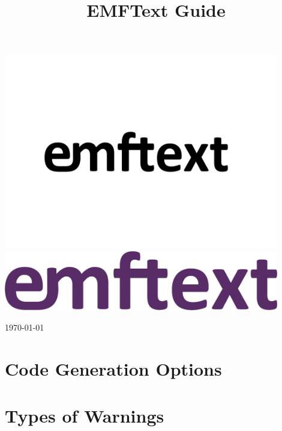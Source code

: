 \documentclass[smallheadings,headsepline,pointlessnumbers,11pt,a4paper]{scrbook}
\title{EMFText Guide}
\newcommand{\changefont}[3]{\fontfamily{#1} \fontseries{#2} \fontshape{#3} \selectfont}
\let\origdoublepage\cleardoublepage
\renewcommand{\cleardoublepage}{%
  \clearpage{\pagestyle{empty}\origdoublepage}}
\begin{document}
\begin{titlepage}

\hbox{}
\vspace{4cm}

\begin{center}

\ifpdf
	\includegraphics[width=0.9\textwidth]{figures/EMFTextLogo.pdf}
\else
	\includegraphics[width=0.9\textwidth]{figures/EMFTextLogo.png}
\fi

\vspace{3cm}
{
\fontsize{40}{40}
\changefont{phv}{m}{n}{USER GUIDE}
}
\end{center}

\vspace{7cm}
\begin{flushright}
\large
\today
\end{flushright}

\end{titlepage}

\cleardoublepage

\tableofcontents

\mainmatter





\renewcommand{\listfigurename}{List of Figures}
\listoffigures
\cleardoublepage

\renewcommand{\lstlistlistingname}{List of Listings\vspace{3mm}}
\lstlistoflistings
\cleardoublepage

\begin{appendix}
\chapter{Code Generation Options}
\label{app:options}


\chapter{Types of Warnings}
\label{app:warnings}

\end{appendix}


\end{document}
